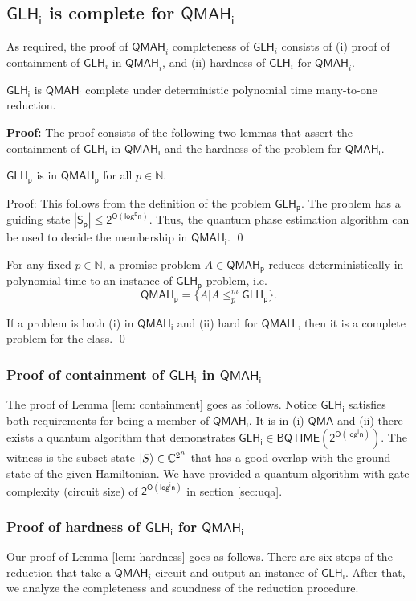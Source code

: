 \documentclass[11pt]{article}
\newcommand{\ms}[1]{\mathsf{#1}}
\begin{document}
\subsection{$\ms{GLH_i}$ is complete for $\ms{QMAH_i}$}
As required, the proof of $\ms{QMAH}_i$ completeness of $\ms{GLH}_i$ consists of (i) proof of containment of $\ms{GLH}_i$ in $\ms{QMAH}_i$, and (ii) hardness of $\ms{GLH}_i$ for $\ms{QMAH}_i$.
\begin{theorem}
    $\ms{GLH_i}$ is $\ms{QMAH_i}$ complete under deterministic polynomial time many-to-one reduction.
\end{theorem}
\textbf{Proof: } The proof consists of the following two lemmas that assert the containment of $\ms{GLH_i}$ in $\ms{QMAH_i}$ and the hardness of the problem for $\ms{QMAH_i}$.
\begin{lemma}
    [Containment] $\ms{GLH_p}$ is in $\ms{QMAH_p}$ for all $p\in \mathbb{N}$.
    \label{lem: containment}
\end{lemma}
Proof: This follows from the definition of the problem $\ms{GLH_p}$. The problem has a guiding state $\ms{|S_p|\leq 2^{O(log^p n)}}$. Thus, the quantum phase estimation algorithm can be used to decide the membership in $\ms{QMAH_i}$. \qed
\begin{lemma}
    [Hardness] For any fixed $p\in \mathbb{N}$, a promise problem $A\in \ms{QMAH_p}$ reduces deterministically in polynomial-time to an instance of $\ms{GLH_p}$ problem, i.e. 
    $$\ms{QMAH_p}=\{A|A\leq^m_p \ms{GLH_p} \}.$$
    \label{lem: hardness}
\end{lemma}
If a problem is both (i) in $\ms{QMAH_i}$ and (ii) hard for $\ms{QMAH_i}$, then it is a complete problem for the class. \qed


\subsubsection{Proof of containment of $\ms{GLH_i}$ in $\ms{QMAH_i}$} 
The proof of Lemma \ref{lem: containment} goes as follows. Notice $\ms{GLH_i}$ satisfies both requirements for being a member of $\ms{QMAH_i}$. It is in (i) $\ms{QMA}$ and (ii) there exists a quantum algorithm that demonstrates $\ms{GLH_i\in BQTIME(2^{O(log^i n)})}$. The witness is the subset state $\ket{S} \in \mathbb{C}^{2^n}$ that has a good overlap with the ground state of the given Hamiltonian. We have provided a quantum algorithm with gate complexity (circuit size) of $\ms{2^{O(log^i n)}}$ in section \ref{sec:uqa}.
\subsubsection{Proof of hardness of $\ms{GLH_i}$ for $\ms{QMAH_i}$} 
Our proof of Lemma \ref{lem: hardness} goes as follows. There are six steps of the reduction that take a $\ms{QMAH}_i$ circuit and output an instance of $\ms{GLH_i}$. After that, we analyze the completeness and soundness of the reduction procedure. \newline
\end{document}
